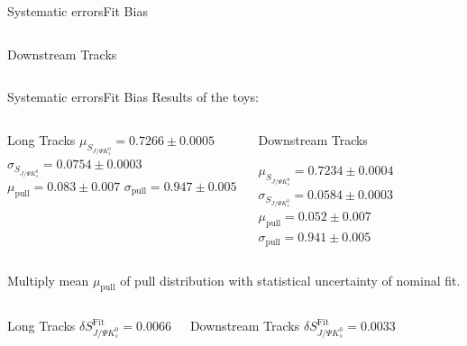 \documentclass{beamer}
\newcommand{\SJPsi}{S_{J/\Psi K_s^0}}
\begin{document}
\begin{frame}{Systematic errors}{Fit Bias}
\begin{columns}
\begin{block}{Downstream Tracks}
	\end{block}
	\end{columns}
	\end{frame}
	
	\begin{frame}{Systematic errors}{Fit Bias}
	Results of the toys:
	\begin{columns}
	\begin{block}{Long Tracks}
        $\mu_{\SJPsi} = 0.7266 \pm 0.0005$
        $\sigma_{\SJPsi} = 0.0754 \pm 0.0003$
        $\mu_{\text{pull}} = 0.083 \pm 0.007$
        $\sigma_{\text{pull}} = 0.947 \pm 0.005$
    \end{block}
	\begin{block}{Downstream Tracks}
    
        $\mu_{\SJPsi} = 0.7234 \pm 0.0004$
        $\sigma_{\SJPsi} = 0.0584 \pm 0.0003$
        $\mu_{\text{pull}} = 0.052 \pm 0.007$
        $\sigma_{\text{pull}} = 0.941 \pm 0.005$
    \end{block}
    \end{columns}
	\vspace{0.5cm} 
	Multiply mean $\mu_{\text{pull}}$ of pull distribution with statistical uncertainty of nominal fit.
	\begin{columns}
	\begin{block}{Long Tracks}
    \centering
        $\delta\SJPsi^{\text{Fit}} = 0.0066$
    \end{block}
	\begin{block}{Downstream Tracks}
    \centering
        $\delta\SJPsi^{\text{Fit}} = 0.0033$
    \end{block}
    \end{columns}
    \end{frame}
	
\end{document}
